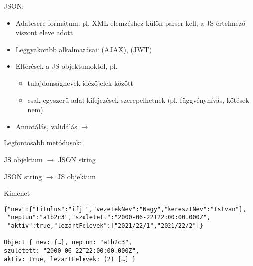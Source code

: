\begin{frame}
  JSON: 
  \begin{itemize}
    \item Adatcsere formátum: pl. XML elemzéshez külön parser kell, a JS értelmező viszont eleve adott
    \item Leggyakoribb alkalmazásai:  (AJAX),  (JWT)
    \item Eltérések a JS objektumoktól, pl.
    \begin{itemize}
      \item tulajdonságnevek idézőjelek között
      \item csak egyszerű adat kifejezések szerepelhetnek (pl. függvényhívás, kötések nem)
    \end{itemize}
    \item Annotálás, validálás $\to$ 
  \end{itemize}
  Legfontosabb metódusok:
  \begin{description}[m]
    \item[\texttt{stringify()}] JS objektum $\to$ JSON string 
    \item[\texttt{parse()}] JSON string $\to$ JS objektum
  \end{description}
\end{frame}

\begin{frame}
  \begin{exampleblock}{}
    \footnotesize
    \vspace{-.3cm}
    
    \vspace{-.3cm}
  \end{exampleblock}
\end{frame}

\begin{frame}[fragile]
  \begin{block}{Kimenet}
    \begin{verbatim}
{"nev":{"titulus":"ifj.","vezetekNev":"Nagy","keresztNev":"Istvan"},
 "neptun":"a1b2c3","szuletett":"2000-06-22T22:00:00.000Z",
 "aktiv":true,"lezartFelevek":["2021/22/1","2021/22/2"]}

Object { nev: {…}, neptun: "a1b2c3", 
szuletett: "2000-06-22T22:00:00.000Z", 
aktiv: true, lezartFelevek: (2) […] }
\end{verbatim}
  \end{block}
\end{frame}

